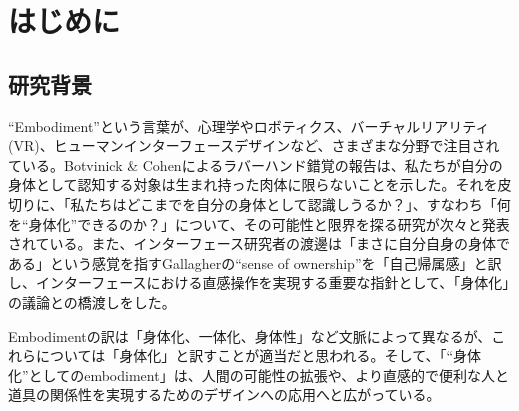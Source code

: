 \chapter{はじめに}
\label{introduction}

\section{研究背景}
\label{subject}
``Embodiment''という言葉が、心理学やロボティクス、バーチャルリアリティ(VR)、ヒューマンインターフェースデザインなど、さまざまな分野で注目されている。Botvinick \& Cohenによるラバーハンド錯覚\cite{BotvinickCohen1998}の報告は、私たちが自分の身体として認知する対象は生まれ持った肉体に限らないことを示した。それを皮切りに、「私たちはどこまでを自分の身体として認識しうるか？」、すなわち「何を``身体化''できるのか？」について、その可能性と限界を探る研究が次々と発表されている。また、インターフェース研究者の渡邊は「まさに自分自身の身体である」という感覚を指すGallagherの``sense of ownership''を「自己帰属感」と訳し、インターフェースにおける直感操作を実現する重要な指針として、「身体化」の議論との橋渡しをした。

Embodimentの訳は「身体化、一体化、身体性」など文脈によって異なるが、これらについては「身体化」と訳すことが適当だと思われる。そして、「``身体化''としてのembodiment」は、人間の可能性の拡張や、より直感的で便利な人と道具の関係性を実現するためのデザインへの応用へと広がっている。





